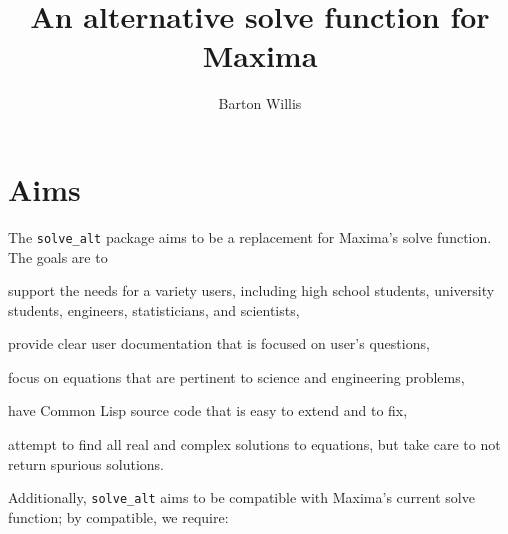 \documentclass[]{scrartcl}
\title{An alternative solve function for Maxima}
\author{Barton Willis}
\newcommand{\altsolve}{\texttt{solve\_alt}}
\begin{document}
\maketitle

\section{Aims}

The \altsolve\/ package aims to be a replacement for Maxima's solve function. The goals are to

\begin{alphalist}[noitemsep]

\item support the needs for a variety users, including high school students,  university students, engineers, statisticians, and scientists,

\item provide clear user documentation that is focused on user's questions,

\item focus on equations that are pertinent to science and engineering problems,

\item have Common Lisp source code that is easy to extend and to fix,

\item attempt to find all real and complex solutions to equations, but take care to not  return spurious solutions.

\end{alphalist}
Additionally, \altsolve\/  aims to be compatible with Maxima's current solve function; by compatible, we require:
\end{document}
